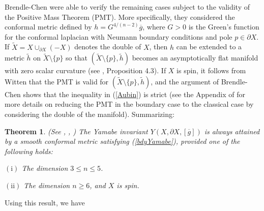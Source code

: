 \documentclass{amsart}
\newtheorem{theorem}{Theorem}[section]
\theoremstyle{definition}
\theoremstyle{remark}
\numberwithin{equation}{section}
\begin{document}
Brendle-Chen were able to verify the remaining cases subject to the validity of the Positive Mass Theorem (PMT).   More specifically, they considered the conformal metric defined by $h = G^{4/(n-2)}\overline{g}$, where $G > 0$ is the Green's function for the conformal laplacian with Neumann boundary conditions and pole $p \in \partial X$.  If $\widetilde{X} = X \cup_{\partial X} (- X)$ denotes the double of $X$, then $h$ can be extended to a metric $\widetilde{h}$ on $\widetilde{X} \setminus \{ p\}$ so that $(\widetilde{X} \setminus \{ p\}, \widetilde{h})$ becomes an asymptotically flat manifold with zero scalar curvature (see \cite{BC}, Proposition 4.3).  If $X$ is spin, it follows from Witten \cite{Witten} that the PMT is valid for $(\widetilde{X} \setminus \{ p\}, \widetilde{h})$, and the argument of Brendle-Chen shows that the inequality in (\ref{Aubin}) is strict (see the Appendix of \cite{EscobarJDG} for more details on reducing the PMT in the boundary case to the classical case by considering the double of the manifold).   Summarizing:

\begin{theorem} (See \cite{EscobarJDG}, \cite{BC}, \cite{Witten}) \label{YPThm}  The Yamabe invariant $Y(X,\partial X, [\overline{g}])$ is always attained by a smooth conformal metric satisfying (\ref{bdyYamabe}), provided one of the following holds:

\smallskip

$\mathrm{(i)}$ The dimension $3 \leq n \leq 5$.

$\mathrm{(ii)}$ The dimension $n \geq 6$, and $X$ is spin.
\end{theorem}

Using this result, we have
\end{document}
